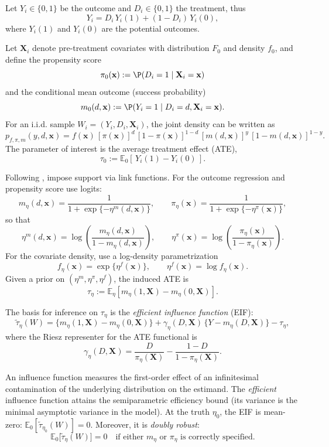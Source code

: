 Let $Y_i\in\{0,1\}$ be the outcome and $D_i\in\{0,1\}$ the treatment, thus
\[
Y_i = D_i\,Y_i(1) + (1-D_i)\,Y_i(0),
\]
where $Y_i(1)$ and $Y_i(0)$ are the potential outcomes.

Let $\mathbf{X}_i$ denote pre-treatment covariates with distribution $F_0$ and density $f_0$, and define the propensity score
\[
\pi_0(\mathbf{x}) := \P(D_i=1\mid \mathbf{X}_i=\mathbf{x})
\]
and the conditional mean outcome (success probability)
\[
m_0(d,\mathbf{x}) := \P(Y_i=1\mid D_i=d,\mathbf{X}_i=\mathbf{x}).
\]
For an i.i.d. sample $W_i=(Y_i,D_i,\mathbf{X}_i)$, the joint density can be written as
\[
p_{f,\pi,m}(y,d,\mathbf{x})
= f(\mathbf{x})\,[\pi(\mathbf{x})]^d\,[1-\pi(\mathbf{x})]^{1-d}\,[m(d,\mathbf{x})]^y\,[1-m(d,\mathbf{x})]^{1-y}.
\]
The parameter of interest is the average treatment effect (ATE),
\[
\tau_0 := \mathbb{E}_0\!\left[\,Y_i(1)-Y_i(0)\,\right].
\]

Following \cite{breunig2025double}, impose support via link functions. For the outcome regression and propensity score use logits:
\[
m_\eta(d,\mathbf{x})=\frac{1}{1+\exp\{-\eta^m(d,\mathbf{x})\}},
\qquad
\pi_\eta(\mathbf{x})=\frac{1}{1+\exp\{-\eta^\pi(\mathbf{x})\}},
\]
so that
\[
\eta^m(d,\mathbf{x})=\log\!\left(\frac{m_\eta(d,\mathbf{x})}{1-m_\eta(d,\mathbf{x})}\right),
\qquad
\eta^\pi(\mathbf{x})=\log\!\left(\frac{\pi_\eta(\mathbf{x})}{1-\pi_\eta(\mathbf{x})}\right).
\]
For the covariate density, use a log-density parametrization
\[
f_\eta(\mathbf{x})=\exp\{\eta^f(\mathbf{x})\},
\qquad
\eta^f(\mathbf{x})=\log f_\eta(\mathbf{x}).
\]
Given a prior on $(\eta^m,\eta^\pi,\eta^f)$, the induced ATE is
\[
\tau_\eta := \mathbb{E}_\eta\!\left[m_\eta(1,\mathbf{X})-m_\eta(0,\mathbf{X})\right].
\]

The basis for inference on $\tau_\eta$ is the \textit{efficient influence function} (EIF):
\[
\tilde{\tau}_\eta(W)
= \big\{m_\eta(1,\mathbf{X})-m_\eta(0,\mathbf{X})\big\}
+ \gamma_\eta(D,\mathbf{X})\,\big\{Y-m_\eta(D,\mathbf{X})\big\}
- \tau_\eta,
\]
where the Riesz representer for the ATE functional is
\[
\gamma_\eta(D,\mathbf{X})
= \frac{D}{\pi_\eta(\mathbf{X})}
- \frac{1-D}{1-\pi_\eta(\mathbf{X})}.
\]

An influence function measures the first-order effect of an infinitesimal contamination of the underlying distribution on the estimand. The \emph{efficient} influence function attains the semiparametric efficiency bound (its variance is the minimal asymptotic variance in the model). At the truth $\eta_0$, the EIF is mean-zero: $\mathbb{E}_0[\tilde{\tau}_{\eta_0}(W)]=0$. Moreover, it is \emph{doubly robust}:
\[
\mathbb{E}_0\!\big[\tilde{\tau}_\eta(W)\big]=0
\quad\text{if either } m_\eta \text{ or } \pi_\eta \text{ is correctly specified.}
\]

